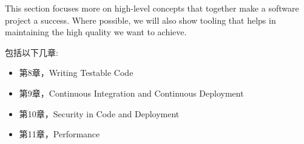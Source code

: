 
This section focuses more on high-level concepts that together make a software project a success. Where possible, we will also show tooling that helps in maintaining the high quality we want to achieve.

包括以下几章:

\begin{itemize}
\item 第8章，Writing Testable Code 
\item 第9章，Continuous Integration and Continuous Deployment 
\item 第10章，Security in Code and Deployment
\item 第11章，Performance 
\end{itemize}